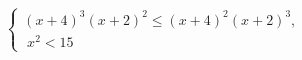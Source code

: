 \begin{ex}[type=ineq_system]
	\begin{condition}
		$\begin{cases} (x + 4)^3(x + 2)^2\leqslant(x + 4)^2(x + 2)^3,\\
			\;x^2<15
		\end{cases}$
	\end{condition}
\end{ex}
